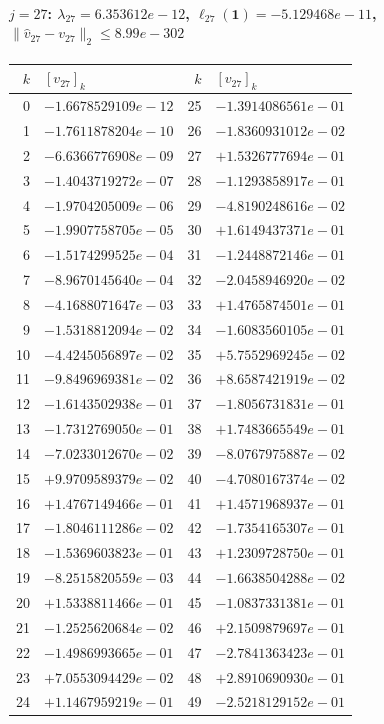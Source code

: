 \paragraph{$j = 27$: $\lambda_{27} = 6.353612e-12$, \quad $\ell_{27}(\mathbf{1}) = -5.129468e-11$, \quad $\|\hat{v}_{27} - v_{27}\|_2 \leq 8.99e-302$}
\begin{center}
{\footnotesize
\begin{tabular}{r@{\;\;}l@{\quad}r@{\;\;}l}
\toprule
$k$ & $[v_{27}]_k$ & $k$ & $[v_{27}]_k$ \\
\midrule
0 & $-1.6678529109e-12$ & 25 & $-1.3914086561e-01$ \\
1 & $-1.7611878204e-10$ & 26 & $-1.8360931012e-02$ \\
2 & $-6.6366776908e-09$ & 27 & $+1.5326777694e-01$ \\
3 & $-1.4043719272e-07$ & 28 & $-1.1293858917e-01$ \\
4 & $-1.9704205009e-06$ & 29 & $-4.8190248616e-02$ \\
5 & $-1.9907758705e-05$ & 30 & $+1.6149437371e-01$ \\
6 & $-1.5174299525e-04$ & 31 & $-1.2448872146e-01$ \\
7 & $-8.9670145640e-04$ & 32 & $-2.0458946920e-02$ \\
8 & $-4.1688071647e-03$ & 33 & $+1.4765874501e-01$ \\
9 & $-1.5318812094e-02$ & 34 & $-1.6083560105e-01$ \\
10 & $-4.4245056897e-02$ & 35 & $+5.7552969245e-02$ \\
11 & $-9.8496969381e-02$ & 36 & $+8.6587421919e-02$ \\
12 & $-1.6143502938e-01$ & 37 & $-1.8056731831e-01$ \\
13 & $-1.7312769050e-01$ & 38 & $+1.7483665549e-01$ \\
14 & $-7.0233012670e-02$ & 39 & $-8.0767975887e-02$ \\
15 & $+9.9709589379e-02$ & 40 & $-4.7080167374e-02$ \\
16 & $+1.4767149466e-01$ & 41 & $+1.4571968937e-01$ \\
17 & $-1.8046111286e-02$ & 42 & $-1.7354165307e-01$ \\
18 & $-1.5369603823e-01$ & 43 & $+1.2309728750e-01$ \\
19 & $-8.2515820559e-03$ & 44 & $-1.6638504288e-02$ \\
20 & $+1.5338811466e-01$ & 45 & $-1.0837331381e-01$ \\
21 & $-1.2525620684e-02$ & 46 & $+2.1509879697e-01$ \\
22 & $-1.4986993665e-01$ & 47 & $-2.7841363423e-01$ \\
23 & $+7.0553094429e-02$ & 48 & $+2.8910690930e-01$ \\
24 & $+1.1467959219e-01$ & 49 & $-2.5218129152e-01$ \\
\bottomrule
\end{tabular}
}
\end{center}

